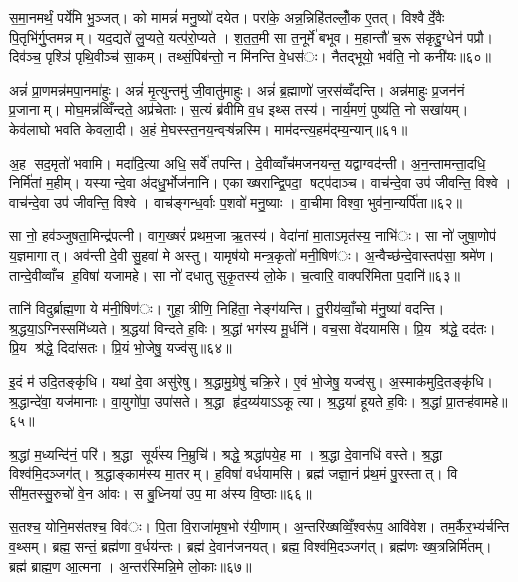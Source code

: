 स॒मा॒नमर्थं॒ पर्ये॑मि भु॒ञ्जत्। को मामन्नं॑ मनु॒ष्यो॑ दयेत। परा॑के॒ अन्न॒न्निहि॑तल्लोँ॒क ए॒तत्। विश्वैर्दे॒वैः पि॒तृभि॑र्गु॒प्तमन्नम्। यद॒द्यते॑ लु॒प्यते॒ यत्प॑रो॒प्यते। श॒त॒त॒मी सा त॒नूर्मे॑ बभूव। म॒हान्तौ॑ च॒रू स॑कृद्दु॒ग्धेन॑ पप्रौ। दिव॑ञ्च॒ पृश्ञि॑ पृथि॒वीञ्च॑ सा॒कम्। तथ्सं॒पिब॑न्तो॒ न मि॑नन्ति वे॒धस॑ः। नैतद्भूयो॒ भव॑ति॒ नो कनी॑यः॥६०॥

अन्नं॑ प्रा॒णमन्न॑मपा॒नमा॑हुः। अन्नं॑ मृ॒त्युन्तमु॑ जी॒वातु॑माहुः। अन्नं॑ ब्र॒ह्माणो॑ ज॒रस॑व्वँदन्ति। अन्न॑माहुः प्र॒जन॑नं प्र॒जानाम्। मोघ॒मन्न॑व्विँन्दते॒ अप्र॑चेताः। स॒त्यं ब्र॑वीमि व॒ध इथ्स तस्य॑। नार्य॒मणं॒ पुष्य॑ति॒ नो सखा॑यम्। केव॑लाघो भवति केवला॒दी। अ॒हं मे॒घस्स्त॒नय॒न्वऱ़्ष॑न्नस्मि। माम॑दन्त्य॒हम॑द्म्य॒न्यान्॥६१॥

अ॒ह सद॒मृतो॑ भवामि। मदा॑दि॒त्या अधि॒ सर्वे॑ तपन्ति। दे॒वीव्वाँच॑मजनयन्त॒ यद्वाग्वद॑न्ती। अ॒न॒न्तामन्ता॒दधि॒ निर्मि॑तां म॒हीम्। यस्यान्दे॒वा अ॑दधु॒र्भोज॑नानि। एकाख्षरान्द्वि॒पदा॒ षट्प॑दाञ्च। वाच॑न्दे॒वा उप॑ जीवन्ति॒ विश्वे। वाच॑न्दे॒वा उप॑ जीवन्ति॒ विश्वे। वाच॑ङ्गन्ध॒र्वाः प॒शवो॑ मनु॒ष्याः। वा॒चीमा विश्वा॒ भुव॑ना॒न्यर्पि॑ता॥६२॥

सा नो॒ हव॑ञ्जुषता॒मिन्द्र॑पत्नी। वाग॒ख्षरं॑ प्रथम॒जा ऋ॒तस्य॑। वेदा॑नां मा॒ताऽमृत॑स्य॒ नाभि॑ः। सा नो॑ जुषा॒णोप॑ य॒ज्ञमागात्। अव॑न्ती दे॒वी सु॒हवा॑ मे अस्तु। यामृष॑यो मन्त्र॒कृतो॑ मनी॒षिण॑ः। अ॒न्वैच्छ॑न्दे॒वास्तप॑सा॒ श्रमे॑ण। तान्दे॒वीव्वाँच ह॒विषा॑ यजामहे। सा नो॑ दधातु सुकृ॒तस्य॑ लो॒के। च॒त्वारि॒ वाक्परि॑मिता प॒दानि॑॥६३॥

तानि॑ विदुर्ब्राह्म॒णा ये म॑नी॒षिण॑ः। गुहा॒ त्रीणि॒ निहि॑ता॒ नेङ्ग॑यन्ति। तु॒रीय॑व्वाँ॒चो म॑नु॒ष्या॑ वदन्ति। श्र॒द्धया॒ऽग्निस्समि॑ध्यते। श्र॒द्धया॑ विन्दते ह॒विः। श्र॒द्धां भग॑स्य मू॒र्धनि॑। वच॒सा वे॑दयामसि। प्रि॒य श्र॑द्धे॒ दद॑तः। प्रि॒य श्र॑द्धे॒ दिदा॑सतः। प्रि॒यं भो॒जेषु॒ यज्व॑सु॥६४॥

इ॒दं म॑ उदि॒तङ्कृ॑धि। यथा॑ दे॒वा असु॑रेषु। श्र॒द्धामु॒ग्रेषु॑ चक्रि॒रे। ए॒वं भो॒जेषु॒ यज्व॑सु। अ॒स्माक॑मुदि॒तङ्कृ॑धि। श्र॒द्धान्दे॑वा॒ यज॑मानाः। वा॒युगो॑पा॒ उपा॑सते। श्र॒द्धा हृ॑द॒य्य॑याऽऽकूत्या। श्र॒द्धया॑ हूयते ह॒विः। श्र॒द्धां प्रा॒तऱ्ह॑वामहे॥६५॥

श्र॒द्धां म॒ध्यन्दि॑नं॒ परि॑। श्र॒द्धा सूर्य॑स्य नि॒म्रुचि॑। श्रद्धे॒ श्रद्धा॑पये॒ह मा। श्र॒द्धा दे॒वानधि॑ वस्ते। श्र॒द्धा विश्व॑मि॒दञ्जग॑त्। श्र॒द्धाङ्काम॑स्य मा॒तरम्। ह॒विषा॑ वर्धयामसि। ब्रह्म॑ जज्ञा॒नं प्र॑थ॒मं पु॒रस्तात्। वि सी॑म॒तस्सु॒रुचो॑ वे॒न आ॑वः। स बु॒ध्निया॑ उप॒ मा अ॑स्य वि॒ष्ठाः॥६६॥

स॒तश्च॒ योनि॒मस॑तश्च॒ विव॑ः। पि॒ता वि॒राजा॑मृष॒भो र॑यी॒णाम्। अ॒न्तरि॑ख्षव्विँ॒श्वरू॑प॒ आवि॑वेश। तम॒र्कैर॒भ्य॑र्चन्ति व॒थ्सम्। ब्रह्म॒ सन्तं॒ ब्रह्म॑णा व॒र्धय॑न्तः। ब्रह्म॑ दे॒वान॑जनयत्। ब्रह्म॒ विश्व॑मि॒दञ्जग॑त्। ब्रह्म॑णः ख्ष॒त्रन्निर्मि॑तम्। ब्रह्म॑ ब्राह्म॒ण आ॒त्मना। अ॒न्तर॑स्मिन्नि॒मे लो॒काः॥६७॥

